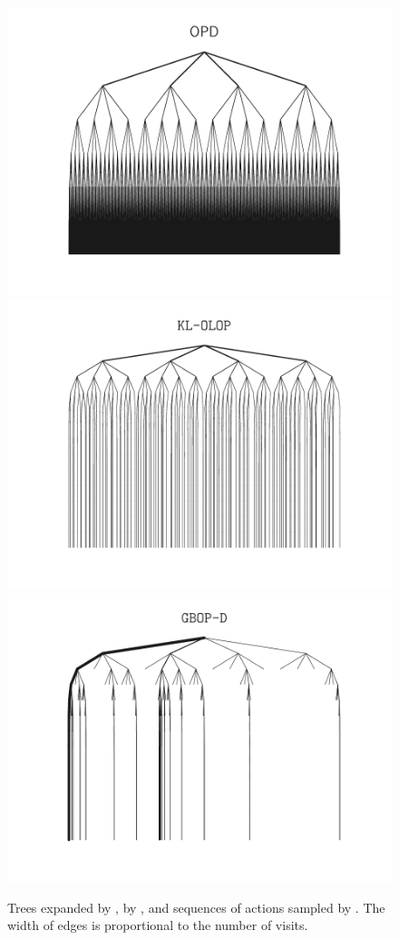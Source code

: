 \begin{figure}[p]
	\centering
	\includegraphics[trim={0 0.5cm 0 0.5cm}, clip, width=0.55\linewidth]{img/gbop/tree_OPD.pdf}
	\includegraphics[trim={0 0.5cm 0 0.5cm}, clip, width=0.55\linewidth]{img/gbop/tree_KL-OLOP.pdf}
	\includegraphics[trim={0 0.5cm 0 0.5cm}, clip, width=0.55\linewidth]{img/gbop/tree_GBOP-D.pdf}
	\caption{Trees expanded by \OPD, by \KLOLOP, and sequences of actions sampled by \GBOPD. The width of edges is proportional to the number of visits.}
	\label{fig:suppl-trees}
\end{figure}

